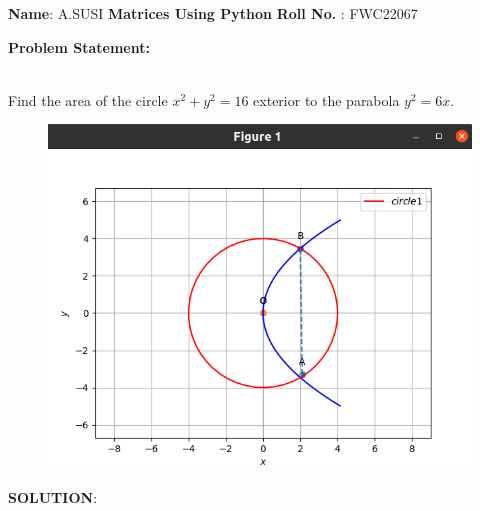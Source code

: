 \documentclass[10pt,a4paper]{report}
\begin{document}
\raggedright \textbf{Name}:\hspace{1mm} A.SUSI\hspace{3cm} \Large \textbf{Matrices Using Python}\hspace{2.5cm} %
\normalsize \textbf{Roll No.} :\hspace{1mm} FWC22067\vspace{1cm}
\begin{multicols}{2}


\raggedright \textbf{Problem Statement:}\vspace{2mm}
\raggedright \\
\fi
	Find the area of the circle $x^2 + y^2 = 16$ exterior to the parabola $y^2 = 6x$.\\
	\solution
	\begin{figure}[!h]
		\centering
 \includegraphics[width=\columnwidth]{chapters/12/8/3/18/figs/cp.jpg}
		\caption{}
		\label{fig:12/8/3/18}
  	\end{figure}
	\iffalse
\vspace{5mm}
\raggedright \textbf{SOLUTION}:\vspace{2mm}\\


\end{multicols}
\end{document}
